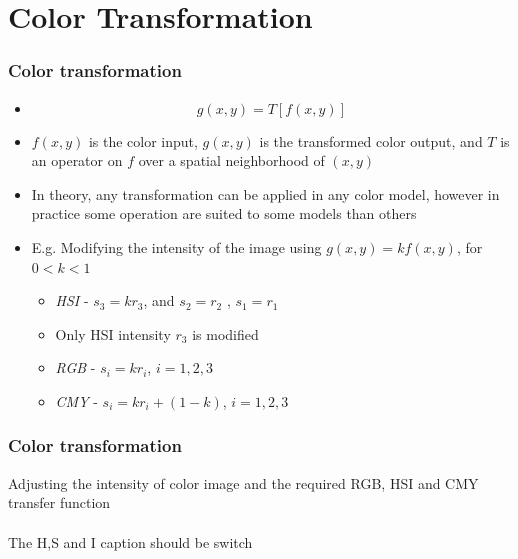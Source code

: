 \documentclass{beamer}
\begin{document}
\section{Color Transformation}
\begin{frame}
\frametitle{Color transformation}
\footnotesize{
\begin{itemize}
\item[]
$$g(x,y) = T[f(x,y)] $$
\item $f(x,y)$ is the color input, $g(x,y)$ is the transformed color output, and $T$ is an operator on $f$ over a spatial neighborhood of $(x,y)$ 
\item In theory, any transformation can be applied in any color model, however in practice some operation are suited to some models than others
\item E.g. Modifying the intensity of the image using $g(x,y) = kf(x,y)$, for $ 0 < k < 1$
\scriptsize{
\begin{itemize}
	\item \textit{HSI} - $s_{3} = kr_{3}$, and $s_{2} = r_{2}$ , $s_{1} = r_{1}$
	\item Only HSI intensity $r_{3}$ is modified 
	\item \textit{RGB} - $s_{i} = kr_{i}$, $i = 1,2,3$
	\item \textit{CMY} - $s_{i} = kr_{i}+(1-k)$, $i = 1,2,3$
\end{itemize}
}
\end{itemize}
}
\end{frame}
\begin{frame}
\frametitle{Color transformation}
\footnotesize{Adjusting the intensity of color image and the required RGB, HSI and CMY transfer function}\\
\\
{\color{red} The H,S and I caption should be switch }
\end{frame}
\end{document}

